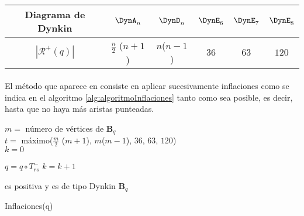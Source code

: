 \begin{tabular}{|c|c|c|c|c|c|}
	Diagrama de Dynkin & $\DynA_{n}$ & $\DynD_{n}$ & $\DynE_{6}$ & $\DynE_{7}$ & $\DynE_{8}$ \\ \hline
	$|\mathcal{R}^{+}(q)|$ & $\frac{n}{2}$ ($n + 1$) & $n$($n-1$) & $36$ & $63$ & $120$ \\ 
\end{tabular}


\paragraph{}
El método que aparece en \citep{alma991031505829703276} consiste en aplicar sucesivamente inflaciones como se indica en el algoritmo \ref{alg:algoritmoInflaciones} tanto como sea posible, es decir, hasta que no haya más aristas punteadas.

\begin{algorithm}[!ht]
\DontPrintSemicolon
  $m =$ número de vértices de $\textbf{B}_{q}$\\
  $t =$ máximo($\frac{m}{2}$ ($m + 1$), $m$($m-1$), $36$, $63$, $120$)\\
  $k = 0$\\
   {
   		$q = q \circ T_{rs}^{-}$\;
   		$k = k + 1$
   		
   }
 \Return es positiva y es de tipo Dynkin $\textbf{B}_{q}$
\caption{Inflaciones(q)}\label{alg:algoritmoInflaciones}
\end{algorithm}

